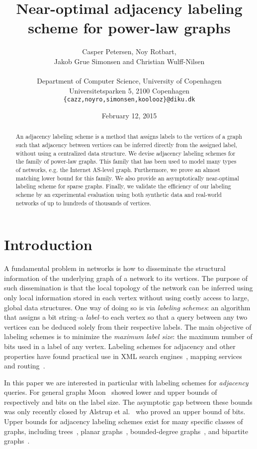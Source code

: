 \documentclass{article}
\date{February 12, 2015}
\title{Near-optimal adjacency labeling scheme for power-law graphs}
\author{Casper Petersen, Noy Rotbart,\\ Jakob Grue Simonsen and Christian Wulff-Nilsen \\ \\
\small{Department of Computer Science, University of Copenhagen} \\
\small{Universitetsparken 5, 2100 Copenhagen}\\
 \small{\texttt{\{cazz,noyro,simonsen,koolooz\}@diku.dk}} \\
}
\theoremstyle{remark}
\begin{document}
\begin{titlepage}
\clearpage\maketitle
\thispagestyle{empty}
\begin{abstract}
An adjacency labeling scheme is a method that assigns labels to the vertices of a graph such that adjacency between vertices 
can be inferred directly from the assigned label, without using a  centralized data structure.
We devise adjacency labeling schemes for  the family  of power-law graphs. This  family that  has been used to model many types of networks, e.g. the Internet AS-level graph. Furthermore, we  prove an almost matching  lower bound for this family.
We also provide an asymptotically near-optimal  labeling scheme for sparse graphs.
Finally, we validate the efficiency of our labeling scheme by  an experimental evaluation  using both synthetic data and real-world networks of up to hundreds of thousands of vertices. 

\end{abstract}
\end{titlepage}
\newpage
\section{Introduction}
A fundamental problem in networks is how to disseminate the structural information of the underlying graph of a network to its vertices. The purpose of such dissemination is that the local topology of the network can be inferred using only local information stored in each vertex without using costly access to large, global data structures.
One way of doing so is via  \emph{ labeling schemes}: an algorithm that assigns a bit string--a \emph{label}--to each vertex so that a query between any two vertices can be deduced solely from their respective labels. 
The main objective of  labeling schemes is to minimize the \emph{maximum label size}: the maximum number of bits used in a label of any vertex. 
Labeling schemes for adjacency and other properties have found practical use in  XML search engines~\cite{cohen2010labeling}, mapping services~\cite{abraham2011hub} and routing~\cite{krioukov2004compact}.

In this paper we are interested in particular with labeling schemes for   \emph{adjacency} queries. 
For general graphs Moon~\cite{moon1965minimal} showed lower and upper bounds of respectively  and  bits on the  label size.
The asymptotic gap between these bounds was only recently closed  by Alstrup et al.~\cite{alstrup2014adjacency} who proved an upper bound of  bits. 
Upper bounds for adjacency labeling schemes exist for many specific classes of graphs, including trees~\cite{Alstrup02}, planar graphs~\cite{gavoille2007shorter},  bounded-degree graphs~\cite{adjiashvili2014labeling}, and bipartite graphs~\cite{lozin2007minimal}.
\end{document}
